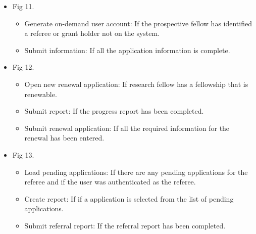 \documentclass[12pt]{article}
\begin{document}
\begin{itemize}
	\item Fig 11.
		\begin{itemize}
			\item Generate on-demand user account: If the prospective fellow has identified a referee or grant holder not on the system.
			\item Submit information: If all the application information is complete.
		\end{itemize}
	
	\item Fig 12.
		\begin{itemize}
			\item Open new renewal application: If research fellow has a fellowship that is renewable.
			\item Submit report: If the progress report has been completed.				
			\item Submit renewal application: If all the required information for the renewal has been entered.									
		\end{itemize}
	
	\item Fig 13.
		\begin{itemize}
			\item Load pending applications: If there are any pending applications for the referee and if the user was authenticated as the referee.
			\item Create report: If if a application is selected from the list of pending applications.				
			\item Submit referral report: If the referral report has been completed.									
		\end{itemize}
		

\end{itemize}
\end{document}
